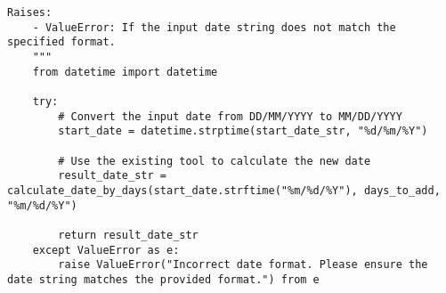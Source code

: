 \begin{tcolorbox}[title=Tools for Date, width=\textwidth,top=0mm, breakable]
\begin{Verbatim}[breaklines=true, breakanywhere=true, fontsize=\footnotesize]
    Raises:
    - ValueError: If the input date string does not match the specified format.
    """
    from datetime import datetime

    try:
        # Convert the input date from DD/MM/YYYY to MM/DD/YYYY
        start_date = datetime.strptime(start_date_str, "%d/%m/%Y")
        
        # Use the existing tool to calculate the new date
        result_date_str = calculate_date_by_days(start_date.strftime("%m/%d/%Y"), days_to_add, "%m/%d/%Y")
        
        return result_date_str
    except ValueError as e:
        raise ValueError("Incorrect date format. Please ensure the date string matches the provided format.") from e
\end{Verbatim}
\end{tcolorbox}


